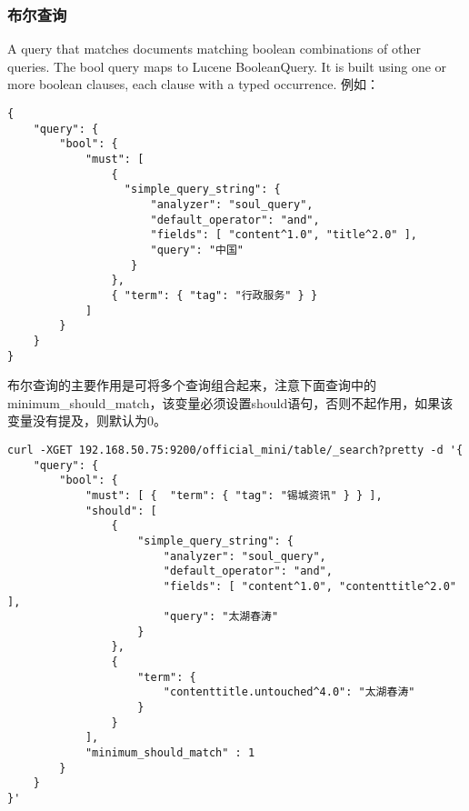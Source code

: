 \subsubsection{布尔查询}
A query that matches documents matching boolean combinations of other queries. The bool query maps to Lucene BooleanQuery. It is built using one or more boolean clauses, each clause with a typed occurrence. 例如：
\begin{verbatim}
{
    "query": {
        "bool": {
            "must": [
                {
                  "simple_query_string": {
                      "analyzer": "soul_query", 
                      "default_operator": "and", 
                      "fields": [ "content^1.0", "title^2.0" ], 
                      "query": "中国"
                   }
                }, 
                { "term": { "tag": "行政服务" } }
            ]
        }
    } 
}
\end{verbatim}
\par 布尔查询的主要作用是可将多个查询组合起来，注意下面查询中的minimum\_should\_match，该变量必须设置should语句，否则不起作用，如果该变量没有提及，则默认为0。
\begin{verbatim}
curl -XGET 192.168.50.75:9200/official_mini/table/_search?pretty -d '{
    "query": {
        "bool": {
            "must": [ {  "term": { "tag": "锡城资讯" } } ], 
            "should": [
                {
                    "simple_query_string": {
                        "analyzer": "soul_query", 
                        "default_operator": "and", 
                        "fields": [ "content^1.0", "contenttitle^2.0" ], 
                        "query": "太湖春涛"
                    }
                }, 
                {
                    "term": {
                        "contenttitle.untouched^4.0": "太湖春涛"
                    }
                }
            ], 
            "minimum_should_match" : 1
        }
    } 
}'
\end{verbatim}
